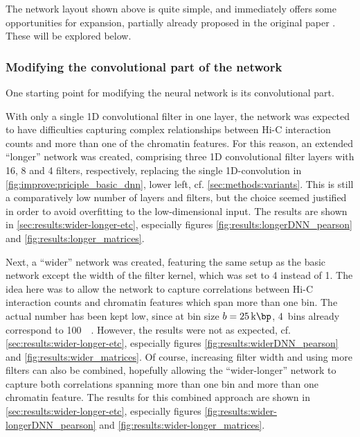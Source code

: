 The network layout shown above is quite simple, and immediately offers some opportunities
for expansion, partially already proposed in the original paper \cite{Farre2018a}.
These will be explored below.

\subsubsection{Modifying the convolutional part of the network} \label{sec:improve:convolution_extensions}
One starting point for modifying the neural network is its convolutional part.

With only a single 1D convolutional filter in one layer, the network was expected to have difficulties capturing complex relationships 
between Hi-C interaction counts and more than one of the chromatin features.
For this reason, an extended ``longer'' network was created, 
comprising three 1D convolutional filter layers with 16, 8 and 4 filters, respectively, replacing the single
1D-convolution in \cref{fig:improve:priciple_basic_dnn}, lower left, cf. \cref{sec:methods:variants}.
This is still a comparatively low number of layers and filters,
but the choice seemed justified in order to avoid overfitting to the low-dimensional input.
The results are shown in \cref{sec:results:wider-longer-etc}, especially figures \ref{fig:results:longerDNN_pearson} and \ref{fig:results:longer_matrices}.

Next, a ``wider'' network was created, featuring the same setup as the basic network
except the width of the filter kernel, which was set to 4 instead of 1.
The idea here was to allow the network to capture correlations between Hi-C interaction counts
and chromatin features which span more than one bin. 
The actual number has been kept low, since at bin size $b=\SI{25}{\kilo\bp}$, 4~bins already correspond to \SI{100}{\kilo\bp}.
However, the results were not as expected, cf. \cref{sec:results:wider-longer-etc}, especially figures \ref{fig:results:widerDNN_pearson} and \ref{fig:results:wider_matrices}.
Of course, increasing filter width and using more filters can also be combined,
hopefully allowing the  ``wider-longer'' network to capture both correlations
spanning more than one bin and more than one chromatin feature.
The results for this combined approach are shown in \cref{sec:results:wider-longer-etc}, especially figures \ref{fig:results:wider-longerDNN_pearson} and \ref{fig:results:wider-longer_matrices}.

